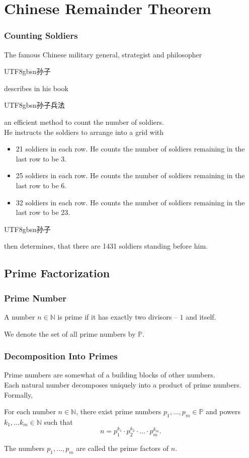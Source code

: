 \documentclass[aspectratio=169,11pt,usenames,dvipsnames]{beamer}
\newcommand{\zh}[1]{\begin{CJK}{UTF8}{gbsn}#1\end{CJK}}
\newcommand{\N}{\mathbb{N}}
\renewcommand{\P}{\mathbb{P}}
\begin{document}
\section{Chinese Remainder Theorem}

\begin{frame}
 \frametitle{Counting Soldiers}
 The famous Chinese military general, strategist and philosopher \zh{孙子}
 describes in his book \zh{孙子兵法} an efficient method to count the number of
 soldiers.\\
 \pause
 He instructs the soldiers to arrange into a grid with
 \begin{itemize}
  \item 21 soldiers in each row. He counts the number of soldiers remaining in
   the last row to be 3.
  \pause
  \item 25 soldiers in each row. He counts the number of soldiers remaining in
   the last row to be 6.
  \pause
  \item 32 soldiers in each row. He counts the number of soldiers remaining in
   the last row to be 23.
 \end{itemize}
 \pause
 \zh{孙子} then determines, that there are 1431 soldiers standing before him.
\end{frame}

\subsection{Prime Factorization}

\begin{frame}
 \subsectionpage
\end{frame}

\begin{frame}
 \frametitle{Prime Number}
 \begin{tcolorbox}[title=Prime Number]
  A number $n \in \N$ is \alert{prime} if it has \alert{exactly two divisors} --
  $1$ and itself.

  We denote the set of all prime numbers by $\mathbb{P}$.
 \end{tcolorbox}
\end{frame}

\begin{frame}
 \frametitle{Decomposition Into Primes}
 Prime numbers are somewhat of a building blocks of other numbers.\\
 \pause
 Each natural number decomposes \alert{uniquely} into a product of prime
 numbers.\\
 \pause
 Formally,
 \begin{tcolorbox}[title=Prime Factorization]
  For each number $n \in \N$, there exist prime numbers $p_1,\ldots,p_m \in \P$ and
  powers $k_1,\ldots k_m \in \N$ such that
  \[
   n = p_1^{k_1} \cdot p_2^{k_2} \cdot \ldots \cdot p_m^{k_m}.
  \]
 \end{tcolorbox}
 \pause
 The numbers $p_1,\ldots,p_m$ are called the \alert{prime factors} of $n$.
\end{frame}
\end{document}
